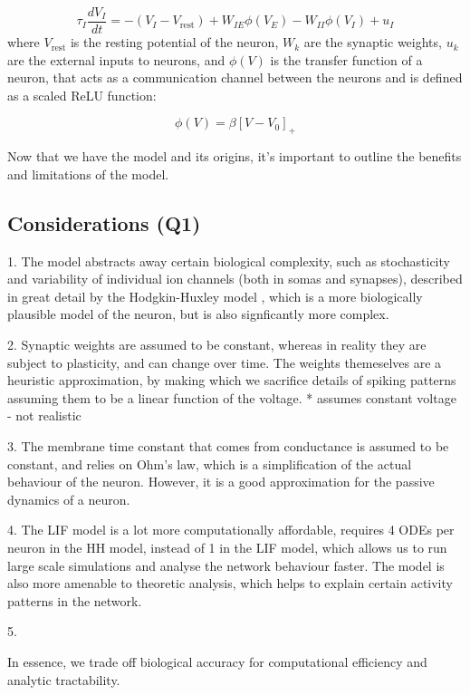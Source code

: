 \documentclass[10pt,twocolumn]{article}
\begin{document}
\begin{equation}
    \tau_I \frac{dV_I}{dt} =
    -(V_I - V_{\text{rest}})
    + W_{IE} \phi(V_E)
    - W_{II} \phi(V_I) + u_I
\end{equation}
where $V_{\text{rest}}$ is the resting potential of the neuron, $W_{k}$ are the
synaptic weights, $u_k$ are the external inputs to neurons,
and $\phi(V)$ is the transfer function of a neuron, that acts as
a communication channel between the neurons and is defined as a scaled ReLU function:

\begin{equation}
    \phi(V) = \beta[V-V_0]_+
\end{equation}

Now that we have the model and its origins, it's important to outline
the benefits and limitations of the model.

\subsection{Considerations (Q1)}
1. The model abstracts away certain biological complexity, such as stochasticity and
variability of individual ion channels (both in somas and synapses), described in
great detail by the Hodgkin-Huxley model \cite{hodgkin1952quantitative}, which is
a more biologically plausible model of the neuron,
but is also signficantly more complex.

2. Synaptic weights are assumed to be constant, whereas in reality they are
subject to plasticity, and can change over time.
The weights themeselves are a heuristic approximation,
by making which we sacrifice details of
spiking patterns assuming them to be a linear function of the voltage.
* assumes constant voltage - not realistic

3. The membrane time constant that comes from conductance is assumed
to be constant, and relies on Ohm's law, which is a simplification of
the actual behaviour of the neuron.
However, it is a good approximation for the passive dynamics of a neuron.

4. The LIF model is a lot more computationally affordable, requires 4 ODEs
per neuron in the HH model, instead of 1 in the LIF model,
which allows us to run large scale simulations and analyse
the network behaviour faster. The model is also more amenable
to theoretic analysis, which helps to explain certain activity patterns in the network.

5.

In essence, we trade off biological accuracy for
computational efficiency and analytic tractability.
\end{document}
